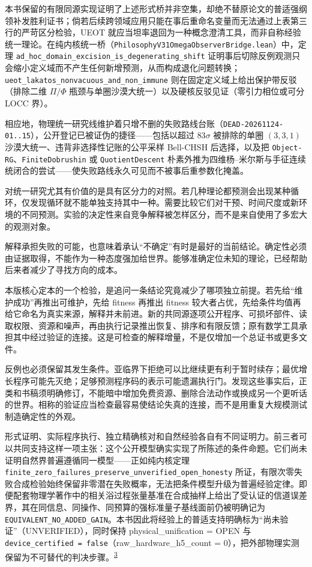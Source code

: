 \documentclass[
  11pt,
  oneside]{book}
\begin{document}
本书保留的有限同源实现证明了上述形式桥并非空集，却绝不替原论文的普适强纲领补发胜利证书；倘若后续跨领域应用只能在事后重命名变量而无法通过上表第三行的严苛区分检验，UEOT 就应当坦率退回为一种概念澄清工具，而非自称经验统一理论。在纯内核统一桥（\nolinkurl{PhilosophyV31OmegaObserverBridge.lean}）中，定理 \nolinkurl{ad_hoc_domain_excision_is_degenerating_shift} 证明事后切除反例观测只会缩小定义域而不产生任何新增预测，从而构成退化问题转换；\nolinkurl{ueot_lakatos_nonvacuous_and_non_immune} 则在固定定义域上给出保护带反驳（排除二维 \(\Pi/\Phi\) 瓶颈与单圈沙漠大统一）以及硬核反驳见证（零引力相位或可分 LOCC 界）。

相应地，物理统一研究线维护着只增不删的失败路线台账（\texttt{DEAD-20261124-01..15}），公开登记已被证伪的捷径------包括以超过 \(83\sigma\) 被排除的单圈 \((3,3,1)\) 沙漠大统一、违背非选择性记账的公平采样 Bell-CHSH 后选择，以及把 \texttt{Object-RG}、\texttt{FiniteDobrushin} 或 \texttt{QuotientDescent} 朴素外推为四维杨--米尔斯与手征连续统闭合的尝试------使失败路线永久可见而不被事后重参数化掩盖。

对统一研究尤其有价值的是具有区分力的对照。若几种理论都预测会出现某种循环，仅发现循环就不能单独支持其中一种。需要比较它们对干预、时间尺度或新环境的不同预测。实验的决定性来自竞争解释被怎样区分，而不是来自使用了多宏大的观测对象。

解释承担失败的可能，也意味着承认``不确定''有时是最好的当前结论。确定性必须由证据取得，不能作为一种态度强加给世界。能够准确定位未知的理论，已经帮助后来者减少了寻找方向的成本。

本版核心定本的一个检验，是追问一条结论究竟减少了哪项独立前提。若先给``维护成功''再推出可维护，先给 fitness 再推出 fitness 较大者占优，先给条件均值再给它命名为真实来源，解释并未前进。新的共同源逐项公开程序、可损坏部件、读取权限、资源和噪声，再由执行记录推出恢复、排序和有限反馈；原有数学工具承担其中经过验证的连接。这是可检查的解释增量，不是仅增加一个总证书或更多文件。

反例也必须保留其发生条件。亚临界下拒绝可以比继续更有利于暂时续存；最优增长程序可能先灭绝；足够预测程序码的表示可能遗漏执行门。发现这些事实后，正类和书稿须明确修订，不能暗中增加免费资源、删除合法动作或换成另一个更听话的世界。相称的验证应当检查最容易使结论失真的连接，而不是用重复大规模测试制造确定性的外观。

\begingroup{}

形式证明、实际程序执行、独立精确核对和自然经验各自有不同证明力。前三者可以共同支持这样一项主张：这个公开模型确实实现了所陈述的条件命题。它们尚未证明自然界普遍遵循同一模型------正如纯内核定理 \nolinkurl{finite_zero_failures_preserve_unverified_open_honesty} 所证，有限次零失败合成检验始终保留非零潜在失败概率，无法把条件模型升级为普遍经验定律。即便配套物理学著作中的相关浴过程张量基准在合成抽样上给出了受认证的信道误差界，其在同信息、同操作、同预算的强标准量子基线面前仍被明确记为 \texttt{EQUIVALENT\_NO\_ADDED\_GAIN}。本书因此将经验上的普适支持明确标为``尚未验证''（UNVERIFIED），同时保持 physical\_unification = OPEN 与 \texttt{device\_certified\ =\ false}（raw\_hardware\_h5\_count = 0），把外部物理实测保留为不可替代的判决步骤。\textsuperscript{\hyperlink{ph-note-3}{3}}
\end{document}
